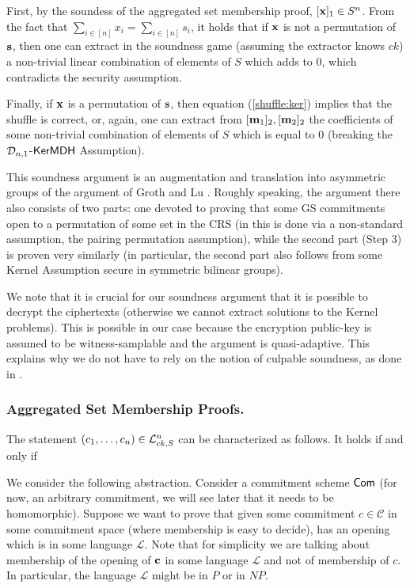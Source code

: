 First, by the soundess of the aggregated set membership proof, $[\mathbf{x}]_1 \in S^{n}$. From the fact that 
 $\sum_{i \in [n]} x_i =\sum_{i \in [n]} s_i$, it holds that if 
 $\mathbf{x}$ is not a permutation of $\mathbf{s}$, then one can extract in the soundness game (assuming the extractor knows $ck$) a non-trivial linear combination of elements of $S$ which adds to $0$, which contradicts the security assumption. 
 
Finally, if $\mathbf{x}$ is a permutation of $\mathbf{s}$,  then equation (\ref{shuffle:ker}) implies that the shuffle is correct, or, again, 
one can extract from   $[\mathbf{m}_1]_2,[\mathbf{m}_2]_2$ the coefficients of some non-trivial combination of elements of $S$ which is equal to $0$ (breaking the $\mathcal{D}_{n,1}$-$\mathsf{KerMDH}$ Assumption). 

This soundness argument is an augmentation and translation into asymmetric groups of the argument of Groth and Lu \cite{AC:GroLu07}. Roughly speaking, the argument there also consists of two parts: one devoted to proving that some GS commitments open to a permutation of some set in the CRS (in \cite{AC:GroLu07} this is done via a non-standard assumption, the pairing permutation assumption), while the second part (Step 3) is proven very similarly (in particular, the second part also follows from some Kernel Assumption secure in symmetric bilinear groups).  

We note that it is crucial for our soundness argument that it is possible to decrypt the ciphertexts (otherwise we cannot extract solutions to the Kernel problems). This is possible in our case because the encryption public-key is assumed to be witness-samplable and the argument is quasi-adaptive. This explains why we do not have to rely on the notion of culpable soundness, as done in \cite{AC:GroLu07,EPRINT:FauLip15}.

\subsubsection{Aggregated Set Membership Proofs.} The statement $(c_1,\ldots,c_n) \in \mathcal{L}_{ck,S}^n$ can be characterized as follows. It holds if and only if 



  






We consider the following abstraction. Consider a commitment scheme $\mathsf{Com}$ (for now, an arbitrary commitment, we will see later that it needs to be homomorphic). Suppose we want to prove that given some commitment $c \in \mathcal{C}$ in some commitment space (where membership is easy to decide), has an opening which is in some language $\mathcal{L}$. Note that for simplicity we are talking about membership of the opening of $\mathbf{c}$ in some language $\mathcal{L}$ and not of membership of $c$. In particular, the language $\mathcal{L}$ might be in $P$ or in $NP$. 

